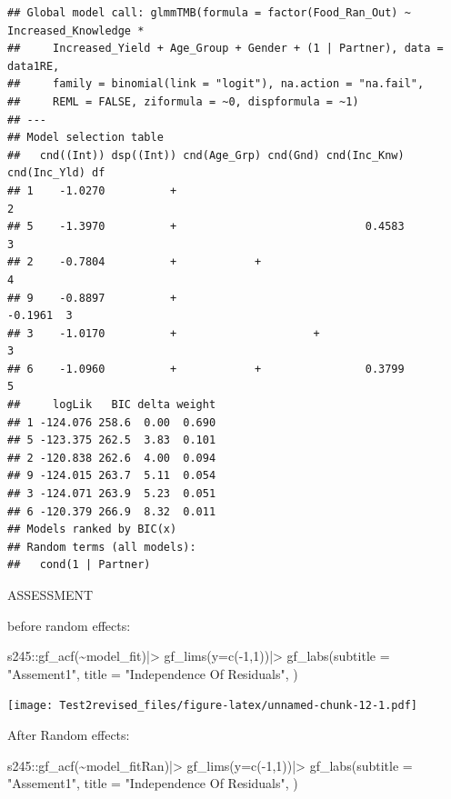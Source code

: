 \documentclass[
]{article}
\newenvironment{Shaded}{\begin{snugshade}}{\end{snugshade}}
\newcommand{\AttributeTok}[1]{\textcolor[rgb]{0.77,0.63,0.00}{#1}}
\newcommand{\DecValTok}[1]{\textcolor[rgb]{0.00,0.00,0.81}{#1}}
\newcommand{\FunctionTok}[1]{\textcolor[rgb]{0.00,0.00,0.00}{#1}}
\newcommand{\NormalTok}[1]{#1}
\newcommand{\SpecialCharTok}[1]{\textcolor[rgb]{0.00,0.00,0.00}{#1}}
\newcommand{\StringTok}[1]{\textcolor[rgb]{0.31,0.60,0.02}{#1}}
\begin{document}
\begin{verbatim}
## Global model call: glmmTMB(formula = factor(Food_Ran_Out) ~ Increased_Knowledge * 
##     Increased_Yield + Age_Group + Gender + (1 | Partner), data = data1RE, 
##     family = binomial(link = "logit"), na.action = "na.fail", 
##     REML = FALSE, ziformula = ~0, dispformula = ~1)
## ---
## Model selection table 
##   cnd((Int)) dsp((Int)) cnd(Age_Grp) cnd(Gnd) cnd(Inc_Knw) cnd(Inc_Yld) df
## 1    -1.0270          +                                                  2
## 5    -1.3970          +                             0.4583               3
## 2    -0.7804          +            +                                     4
## 9    -0.8897          +                                         -0.1961  3
## 3    -1.0170          +                     +                            3
## 6    -1.0960          +            +                0.3799               5
##     logLik   BIC delta weight
## 1 -124.076 258.6  0.00  0.690
## 5 -123.375 262.5  3.83  0.101
## 2 -120.838 262.6  4.00  0.094
## 9 -124.015 263.7  5.11  0.054
## 3 -124.071 263.9  5.23  0.051
## 6 -120.379 266.9  8.32  0.011
## Models ranked by BIC(x) 
## Random terms (all models): 
##   cond(1 | Partner)
\end{verbatim}

ASSESSMENT

before random effects:

\begin{Shaded}
\begin{Highlighting}[]
\NormalTok{s245}\SpecialCharTok{::}\FunctionTok{gf\_acf}\NormalTok{(}\SpecialCharTok{\textasciitilde{}}\NormalTok{model\_fit)}\SpecialCharTok{|\textgreater{}}
\FunctionTok{gf\_lims}\NormalTok{(}\AttributeTok{y=}\FunctionTok{c}\NormalTok{(}\SpecialCharTok{{-}}\DecValTok{1}\NormalTok{,}\DecValTok{1}\NormalTok{))}\SpecialCharTok{|\textgreater{}}
   \FunctionTok{gf\_labs}\NormalTok{(}\AttributeTok{subtitle =} \StringTok{"Assement1"}\NormalTok{, }\AttributeTok{title =} \StringTok{"Independence Of Residuals"}\NormalTok{, )}
\end{Highlighting}
\end{Shaded}

\texttt{[image: Test2revised\_files/figure-latex/unnamed-chunk-12-1.pdf]}

After Random effects:

\begin{Shaded}
\begin{Highlighting}[]
\NormalTok{s245}\SpecialCharTok{::}\FunctionTok{gf\_acf}\NormalTok{(}\SpecialCharTok{\textasciitilde{}}\NormalTok{model\_fitRan)}\SpecialCharTok{|\textgreater{}}
\FunctionTok{gf\_lims}\NormalTok{(}\AttributeTok{y=}\FunctionTok{c}\NormalTok{(}\SpecialCharTok{{-}}\DecValTok{1}\NormalTok{,}\DecValTok{1}\NormalTok{))}\SpecialCharTok{|\textgreater{}}
   \FunctionTok{gf\_labs}\NormalTok{(}\AttributeTok{subtitle =} \StringTok{"Assement1"}\NormalTok{, }\AttributeTok{title =} \StringTok{"Independence Of Residuals"}\NormalTok{, )}
\end{Highlighting}
\end{Shaded}
\end{document}
